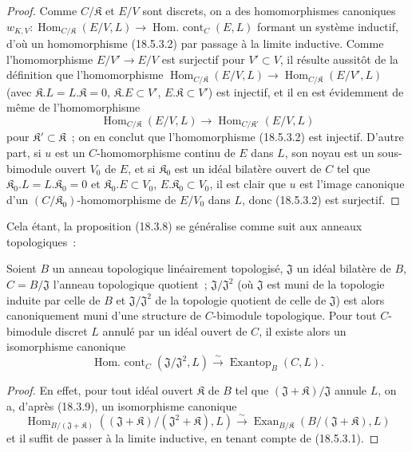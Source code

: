 \begin{proof}
Comme $C/\mathfrak K$ et $E/V$ sont discrets, on a des homomorphismes
canoniques
$w_{K,V}:\operatorname{Hom}_{C/\mathfrak K}(E/V,L)\longrightarrow\operatorname{Hom.\ cont}_C(E,L)$
formant un système inductif, d'où un homomorphisme (18.5.3.2) par passage à la
limite inductive. Comme l'homomorphisme $E/V'\to E/V$ est surjectif pour
$V'\subset V$, il résulte aussitôt de la définition que l'homomorphisme
$\operatorname{Hom}_{C/\mathfrak K}(E/V,L)\longrightarrow\operatorname{Hom}_{C/\mathfrak K}(E/V',L)$
(avec $\mathfrak K.L=L.\mathfrak K=0$, $\mathfrak K.E\subset V'$,
$E.\mathfrak K\subset V'$) est injectif, et il en est évidemment de même de
l'homomorphisme
\[
  \operatorname{Hom}_{C/\mathfrak K}(E/V,L)
  \longrightarrow\operatorname{Hom}_{C/\mathfrak K'}(E/V,L)
\]
pour $\mathfrak K'\subset\mathfrak K$~; on en conclut que l'homomorphisme
(18.5.3.2) est injectif. D'autre part, si $u$ est un $C$-homomorphisme continu
de $E$ dans $L$, son noyau est un sous-bimodule ouvert $V_0$ de $E$, et si
$\mathfrak K_0$ est un idéal bilatère ouvert de $C$ tel que
$\mathfrak K_0.L=L.\mathfrak K_0=0$ et $\mathfrak K_0.E\subset V_0$,
$E.\mathfrak K_0\subset V_0$, il est clair que $u$ est l'image canonique d'un
$(C/\mathfrak K_0)$-homomorphisme de $E/V_0$ dans $L$, donc (18.5.3.2) est
surjectif.
\end{proof}

Cela étant, la proposition (18.3.8) se généralise comme suit aux anneaux
topologiques~:

\begin{proposition}[18.5.4]
\label{0.18.5.4-fr}
Soient $B$ un anneau topologique linéairement topologisé, $\mathfrak J$ un
idéal bilatère de $B$, $C=B/\mathfrak J$ l'anneau topologique quotient~;
$\mathfrak J/\mathfrak J^2$ (où $\mathfrak J$ est muni de la topologie induite
par celle de $B$ et $\mathfrak J/\mathfrak J^2$ de la topologie quotient de
celle de $\mathfrak J$) est alors canoniquement muni d'une structure de
$C$-bimodule topologique. Pour tout $C$-bimodule discret $L$ annulé par un
idéal ouvert de $C$, il existe alors un isomorphisme canonique
\begin{equation}
\label{0.18.5.4.1-fr}
\tag{18.5.4.1}
  \operatorname{Hom.\ cont}_C(\mathfrak J/\mathfrak J^2,L)
  \xrightarrow{\sim}\operatorname{Exantop}_B(C,L).
\end{equation}
\end{proposition}

\begin{proof}
En effet, pour tout idéal ouvert $\mathfrak K$ de $B$ tel que
$(\mathfrak J+\mathfrak K)/\mathfrak J$ annule $L$, on a, d'après (18.3.9),
un isomorphisme canonique
\[
  \operatorname{Hom}_{B/(\mathfrak J+\mathfrak K)}
    ((\mathfrak J+\mathfrak K)/(\mathfrak J^2+\mathfrak K),L)
  \xrightarrow{\sim}
  \operatorname{Exan}_{B/\mathfrak K}(B/(\mathfrak J+\mathfrak K),L)
\]
et il suffit de passer à la limite inductive, en tenant compte de (18.5.3.1).
\end{proof}
